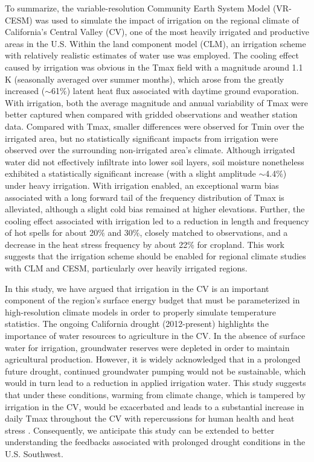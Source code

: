 To summarize, the variable-resolution Community Earth System Model (VR-CESM) was used to simulate the impact of irrigation on the regional climate of California's Central Valley (CV), one of the most heavily irrigated and productive areas in the U.S. Within the land component model (CLM), an irrigation scheme with relatively realistic estimates of water use was employed. The cooling effect caused by irrigation was obvious in the Tmax field with a magnitude around 1.1 K (seasonally averaged over summer months), which arose from the greatly increased ($\sim$61$\%$) latent heat flux associated with daytime ground evaporation. With irrigation, both the average magnitude and annual variability of Tmax were better captured when compared with gridded observations and weather station data. Compared with Tmax, smaller differences were observed for Tmin over the irrigated area, but no statistically significant impacts from irrigation were observed over the surrounding non-irrigated area's climate. Although irrigated water did not effectively infiltrate into lower soil layers, soil moisture nonetheless exhibited a statistically significant increase (with a slight amplitude $\sim$4.4$\%$) under heavy irrigation. With irrigation enabled, an exceptional warm bias associated with a long forward tail of the frequency distribution of Tmax is alleviated, although a slight cold bias remained at higher elevations. Further, the cooling effect associated with irrigation led to a reduction in length and frequency of hot spells for about 20$\%$ and 30$\%$, closely matched to observations, and a decrease in the heat stress frequency by about 22$\%$ for cropland. This work suggests that the irrigation scheme should be enabled for regional climate studies with CLM and CESM, particularly over heavily irrigated regions.

In this study, we have argued that irrigation in the CV is an important component of the region's surface energy budget that must be parameterized in high-resolution climate models in order to properly simulate temperature statistics. The ongoing California drought (2012-present) highlights the importance of water resources to agriculture in the CV. In the absence of surface water for irrigation, groundwater reserves were depleted in order to maintain agricultural production.  However, it is widely acknowledged that in a prolonged future drought, continued groundwater pumping would not be sustainable, which would in turn lead to a reduction in applied irrigation water.  This study suggests that under these conditions, warming from climate change, which is tampered by irrigation in the CV, would be exacerbated and leads to a substantial increase in daily Tmax throughout the CV with repercussions for human health and heat stress \cite{williams2015contribution}. Consequently, we anticipate this study can be extended to better understanding the feedbacks associated with prolonged drought conditions in the U.S. Southwest.


